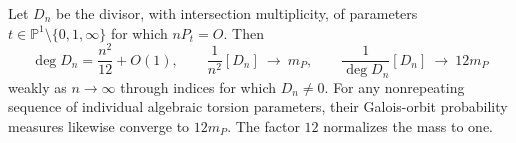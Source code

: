 \begin{proposition}\hypertarget{tag-001K}{}\label{ari:C.8.10}

Let $D_n$ be the divisor, with intersection multiplicity, of
parameters $t\in\mathbb P^1\setminus\{0,1,\infty\}$ for which
$nP_t=O$. Then
\[
 \deg D_n=\frac{n^2}{12}+O(1),\qquad
 \frac1{n^2}[D_n]\ \longrightarrow\ m_P,\qquad
 \frac1{\deg D_n}[D_n]\ \longrightarrow\ 12m_P
\]
weakly as $n\to\infty$ through indices for which $D_n\ne0$.
For any nonrepeating sequence of individual algebraic torsion
parameters, their Galois-orbit probability measures likewise
converge to $12m_P$. The factor $12$ normalizes the mass to one.
\end{proposition}


